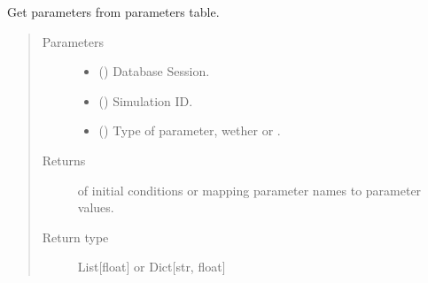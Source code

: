 \documentclass[a4paper,landscape,10pt,english]{sphinxmanual}
\begin{document}
\begin{fulllineitems}
\label{\detokenize{code_docs/simulation_api.model:simulation_api.model.crud._get_parameters}}
Get parameters from parameters table.
\begin{quote}\begin{description}
\item[{Parameters}] \leavevmode\begin{itemize}
\item {} 
 () \textendash{} Database Session.

\item {} 
 () \textendash{} Simulation ID.

\item {} 
 ({\hyperref[\detokenize{code_docs/simulation_api.controller:simulation_api.controller.schemas.ParamType}]{}}) \textendash{} Type of parameter, wether  or .

\end{itemize}

\item[{Returns}] \leavevmode
{} of initial conditions or  mapping parameter names to
parameter values.

\item[{Return type}] \leavevmode
List{[}float{]} or Dict{[}str, float{]}

\end{description}\end{quote}

\end{fulllineitems}
\end{document}
